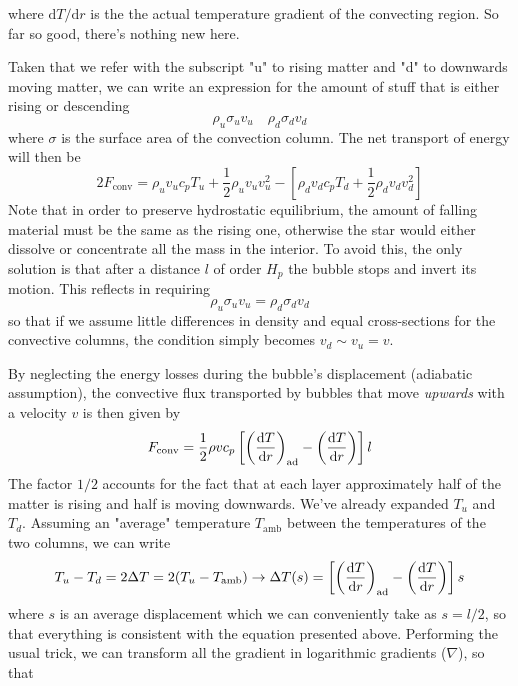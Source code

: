 where $\text{d}T/\text{d}r$ is the the actual temperature gradient of the convecting region. So far so good, there's nothing new here.
\par Taken that we refer with the subscript "u" to rising matter and "d" to downwards moving matter, we can write an expression for the amount of stuff that is either rising or descending
\begin{equation*}
	\rho_{u}\sigma_{u}v_{u} \quad \rho_{d}\sigma_{d}v_{d}
\end{equation*}
where $\sigma$ is the surface area of the convection column. The net transport of energy will then be 
\begin{equation*}
	2F_{\text{conv}} = \rho_{u}v_{u}c_{p}T_{u}+\frac{1}{2}\rho_{u}v_{u}v_{u}^{2}-\left[\rho_{d}v_{d}c_{p}T_{d}+\frac{1}{2}\rho_{d}v_{d}v_{d}^{2}\right]
\end{equation*}
Note that in order to preserve hydrostatic equilibrium, the amount of falling material must be the same as the rising one, otherwise the star would either dissolve or concentrate all the mass in the interior. To avoid this, the only solution is that after a distance $l$ of order $H_{p}$ the bubble stops and invert its motion. This reflects in requiring 
\begin{equation*}
	\rho_{u}\sigma_{u}v_{u} = \rho_{d}\sigma_{d}v_{d}
\end{equation*}
so that if we assume little differences in density and equal cross-sections for the convective columns, the condition simply becomes $v_{d}\sim v_{u} = v$.
\par By neglecting the energy losses during the bubble's displacement (adiabatic assumption), the convective flux transported by bubbles that move \emph{upwards} with a velocity $v$ is then given by 
\begin{equation*}
	F_{\text{conv}} = \frac{1}{2}\rho v c_{p}\left[\left(\frac{\text{d}T}{\text{d}r}\right)_{\text{ad}}-\left(\frac{\text{d}T}{\text{d}r}\right)\right]l
\end{equation*}
The factor $1/2$ accounts for the fact that at each layer approximately half of the matter is rising and half is moving downwards. We've already expanded $T_{u}$ and $T_{d}$. Assuming an "average" temperature $T_{\text{amb}}$ between the temperatures of the two columns, we can write
\begin{equation*}
	T_{u}-T_{d} = 2\Delta T = 2(T_{u}-T_{\text{amb}}) \to \Delta T(s) = \left[\left(\frac{\text{d}T}{\text{d}r}\right)_{\text{ad}}-\left(\frac{\text{d}T}{\text{d}r}\right)\right]s
\end{equation*}
where $s$ is an average displacement which we can conveniently take as $s=l/2$, so that everything is consistent with the equation presented above. Performing the usual trick, we can transform all the gradient in logarithmic gradients ($\nabla$), so that 
